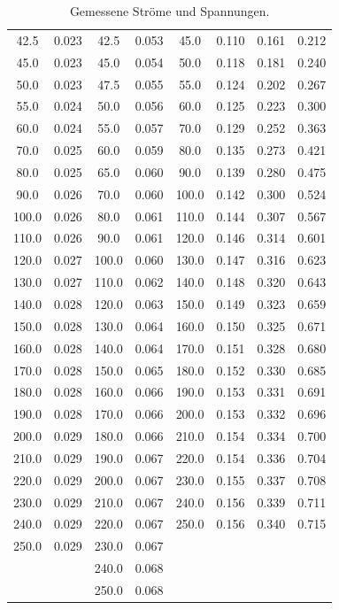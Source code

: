 \documentclass[
  bibliography=totoc,     %
  captions=tableheading,  %
  titlepage=firstiscover, %
]{scrartcl}
\begin{document}
\begin{table}
\begin{tabular}{S[table-format=3.1] S | S[table-format=3.1] S | S[table-format=3.1] S S S}
    42.5  & 0.023 & 42.5  & 0.053 & 45.0  & 0.110 & 0.161 & 0.212 \\
    45.0  & 0.023 & 45.0  & 0.054 & 50.0  & 0.118 & 0.181 & 0.240 \\
    50.0  & 0.023 & 47.5  & 0.055 & 55.0  & 0.124 & 0.202 & 0.267 \\
    55.0  & 0.024 & 50.0  & 0.056 & 60.0  & 0.125 & 0.223 & 0.300 \\
    60.0  & 0.024 & 55.0  & 0.057 & 70.0  & 0.129 & 0.252 & 0.363 \\
    70.0  & 0.025 & 60.0  & 0.059 & 80.0  & 0.135 & 0.273 & 0.421 \\
    80.0  & 0.025 & 65.0  & 0.060 & 90.0  & 0.139 & 0.280 & 0.475 \\
    90.0  & 0.026 & 70.0  & 0.060 & 100.0 & 0.142 & 0.300 & 0.524 \\
    100.0 & 0.026 & 80.0  & 0.061 & 110.0 & 0.144 & 0.307 & 0.567 \\
    110.0 & 0.026 & 90.0  & 0.061 & 120.0 & 0.146 & 0.314 & 0.601 \\
    120.0 & 0.027 & 100.0 & 0.060 & 130.0 & 0.147 & 0.316 & 0.623 \\
    130.0 & 0.027 & 110.0 & 0.062 & 140.0 & 0.148 & 0.320 & 0.643 \\
    140.0 & 0.028 & 120.0 & 0.063 & 150.0 & 0.149 & 0.323 & 0.659 \\
    150.0 & 0.028 & 130.0 & 0.064 & 160.0 & 0.150 & 0.325 & 0.671 \\
    160.0 & 0.028 & 140.0 & 0.064 & 170.0 & 0.151 & 0.328 & 0.680 \\
    170.0 & 0.028 & 150.0 & 0.065 & 180.0 & 0.152 & 0.330 & 0.685 \\
    180.0 & 0.028 & 160.0 & 0.066 & 190.0 & 0.153 & 0.331 & 0.691 \\
    190.0 & 0.028 & 170.0 & 0.066 & 200.0 & 0.153 & 0.332 & 0.696 \\
    200.0 & 0.029 & 180.0 & 0.066 & 210.0 & 0.154 & 0.334 & 0.700 \\
    210.0 & 0.029 & 190.0 & 0.067 & 220.0 & 0.154 & 0.336 & 0.704 \\
    220.0 & 0.029 & 200.0 & 0.067 & 230.0 & 0.155 & 0.337 & 0.708 \\
    230.0 & 0.029 & 210.0 & 0.067 & 240.0 & 0.156 & 0.339 & 0.711 \\
    240.0 & 0.029 & 220.0 & 0.067 & 250.0 & 0.156 & 0.340 & 0.715 \\
    250.0 & 0.029 & 230.0 & 0.067 &       &       &       &       \\
          &       & 240.0 & 0.068 &       &       &       &       \\
          &       & 250.0 & 0.068 &       &       &       &       \\
    \bottomrule
  \end{tabular}
  \caption{Gemessene Ströme und Spannungen.}
  \label{tab:messwerte1}
\end{table}
\end{document}
